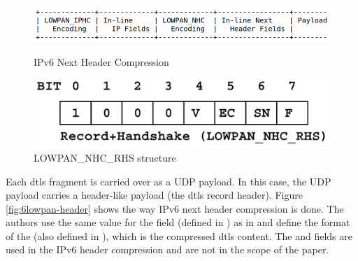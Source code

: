 \documentclass{llncs}
\begin{document}
{\begin{figure}
    \centering
    \begin{minipage}{0.5\textwidth}
        \centering
        \includegraphics[width=1.0\textwidth]{img/6lowpan-header.png} %
        \caption{\label{fig:6lowpan-header} IPv6 Next Header Compression}
    \end{minipage}\hfill
    \begin{minipage}{0.5\textwidth}
        \centering
        \includegraphics[width=1.0\textwidth]{img/6lowpan-ghc-rhs.png} %
        \caption{\label{fig:6lowpan-ghc-rhs} LOWPAN\_NHC\_RHS structure}
    \end{minipage}
\end{figure}


Each \gls{dtls} fragment is carried over as a UDP payload. In this case,
the UDP payload carries a header-like payload (the \gls{dtls} record header).
Figure \ref{fig:6lowpan-header} shows the way IPv6 next header compression is done.
The authors use the same value for the  field (defined in \cite{RFC6282})
as in  and define the format of the 
(also defined in \cite{RFC6282}), which is the compressed \gls{dtls} content. The 
and  fields are used in the IPv6 header compression
and are not in the scope of the paper.

}
\end{document}
